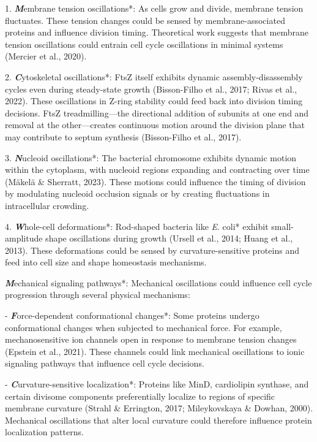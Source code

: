 \documentclass[11pt,a4paper]{article}
\begin{document}
1. \textbf\textit*Membrane tension oscillations*: As cells grow and divide, membrane tension fluctuates. These tension changes could be sensed by membrane-associated proteins and influence division timing. Theoretical work suggests that membrane tension oscillations could entrain cell cycle oscillations in minimal systems (Mercier et al., 2020).

2. \textbf\textit*Cytoskeletal oscillations*: FtsZ itself exhibits dynamic assembly-disassembly cycles even during steady-state growth (Bisson-Filho et al., 2017; Rivas et al., 2022). These oscillations in Z-ring stability could feed back into division timing decisions. FtsZ treadmilling—the directional addition of subunits at one end and removal at the other—creates continuous motion around the division plane that may contribute to septum synthesis (Bisson-Filho et al., 2017).

3. \textbf\textit*Nucleoid oscillations*: The bacterial chromosome exhibits dynamic motion within the cytoplasm, with nucleoid regions expanding and contracting over time (Mäkelä & Sherratt, 2023). These motions could influence the timing of division by modulating nucleoid occlusion signals or by creating fluctuations in intracellular crowding.

4. \textbf\textit*Whole-cell deformations*: Rod-shaped bacteria like \textit*E. coli* exhibit small-amplitude shape oscillations during growth (Ursell et al., 2014; Huang et al., 2013). These deformations could be sensed by curvature-sensitive proteins and feed into cell size and shape homeostasis mechanisms.

\textbf\textit*Mechanical signaling pathways*: Mechanical oscillations could influence cell cycle progression through several physical mechanisms:

- \textbf\textit*Force-dependent conformational changes*: Some proteins undergo conformational changes when subjected to mechanical force. For example, mechanosensitive ion channels open in response to membrane tension changes (Epstein et al., 2021). These channels could link mechanical oscillations to ionic signaling pathways that influence cell cycle decisions.

- \textbf\textit*Curvature-sensitive localization*: Proteins like MinD, cardiolipin synthase, and certain divisome components preferentially localize to regions of specific membrane curvature (Strahl & Errington, 2017; Mileykovskaya & Dowhan, 2000). Mechanical oscillations that alter local curvature could therefore influence protein localization patterns.
\end{document}
